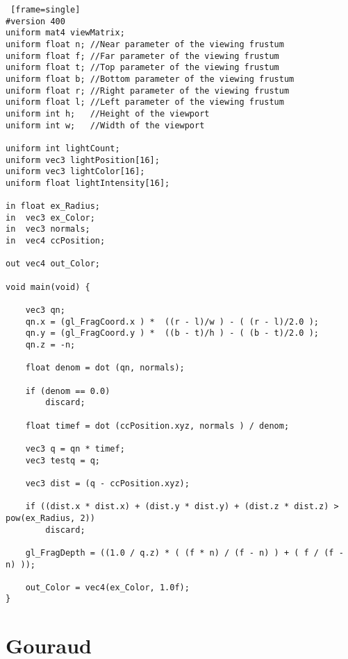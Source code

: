 \begin{lstlisting} [frame=single]
#version 400
uniform mat4 viewMatrix;
uniform float n; //Near parameter of the viewing frustum
uniform float f; //Far parameter of the viewing frustum
uniform float t; //Top parameter of the viewing frustum
uniform float b; //Bottom parameter of the viewing frustum
uniform float r; //Right parameter of the viewing frustum
uniform float l; //Left parameter of the viewing frustum
uniform int h; 	 //Height of the viewport
uniform int w; 	 //Width of the viewport

uniform int lightCount;
uniform vec3 lightPosition[16];
uniform vec3 lightColor[16];
uniform float lightIntensity[16];

in float ex_Radius;
in  vec3 ex_Color;
in  vec3 normals;
in 	vec4 ccPosition;

out vec4 out_Color;

void main(void) {

	vec3 qn;
	qn.x = (gl_FragCoord.x ) *  ((r - l)/w ) - ( (r - l)/2.0 );
	qn.y = (gl_FragCoord.y ) *  ((b - t)/h ) - ( (b - t)/2.0 );
	qn.z = -n;

	float denom = dot (qn, normals);

	if (denom == 0.0)
		discard;

	float timef = dot (ccPosition.xyz, normals ) / denom;

	vec3 q = qn * timef;
	vec3 testq = q;
	
	vec3 dist = (q - ccPosition.xyz);

	if ((dist.x * dist.x) + (dist.y * dist.y) + (dist.z * dist.z) > pow(ex_Radius, 2))
		discard;

	gl_FragDepth = ((1.0 / q.z) * ( (f * n) / (f - n) ) + ( f / (f - n) ));

	out_Color = vec4(ex_Color, 1.0f);
}
\end{lstlisting}
\newpage

\section{Gouraud \label{gouraud}}
